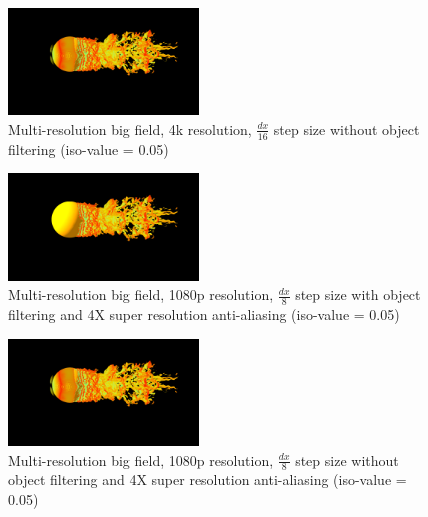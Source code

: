 \documentclass[acmtog]{acmart}
\begin{document}
    \begin{figure}[H]
        \centering
        \includegraphics[width=0.45\textwidth]{./image/multi_big_4k_16_no_filter}
        \caption{Multi-resolution big field, 4k resolution, $ \frac{dx}{16} $ step size without object filtering (iso-value = 0.05)}\label{fig:figure2}
    \end{figure}

    \begin{figure}[H]
        \centering
        \includegraphics[width=0.45\textwidth]{./image/multi_big_1080p_8_filter_4XRES}
        \caption{Multi-resolution big field, 1080p resolution, $ \frac{dx}{8} $ step size with object filtering and 4X super resolution anti-aliasing (iso-value = 0.05)}\label{fig:figure3}
    \end{figure}

    \begin{figure}[H]
        \centering
        \includegraphics[width=0.45\textwidth]{./image/multi_big_1080p_8_no_filter_4XRES}
        \caption{Multi-resolution big field, 1080p resolution, $ \frac{dx}{8} $ step size without object filtering and 4X super resolution anti-aliasing  (iso-value = 0.05)}\label{fig:figure4}
    \end{figure}
\end{document}
